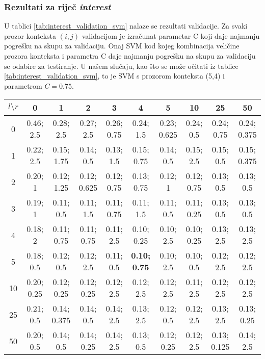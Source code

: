\documentclass[10pt, a4paper]{article}
\begin{document}
\subsubsection{Rezultati za riječ \emph{interest}}
U tablici \ref{tab:interest_validation_svm} nalaze se rezultati validacije.
Za svaki prozor konteksta $(i,j)$ validacijom je izračunat parametar C koji
daje najmanju pogrešku na skupu za validaciju. Onaj SVM kod kojeg kombinacija veličine prozora konteksta i parametra C daje najmanju pogrešku na skupu za validaciju se odabire za testiranje.
U našem slučaju, kao što se može očitati iz tablice \ref{tab:interest_validation_svm}, to je SVM s prozorom konteksta (5,4) i parametrom $C=0.75$.
\begin{table*}[!hbtp]
\caption{Pogreške i vrijednosti parametara C nakon provedene validacije SVM-a za riječ \emph{interest}}
\label{tab:interest_validation_svm}
\begin{center}
\begin{tabular}{|c|ccccccccc|}
\hline
$l \setminus r$ & 0 & 1 & 2 & 3 & 4 & 5 & 10 & 25 & 50 \\
\hline
0 & 0.46; 2.5 & 0.28; 2.5 & 0.27; 2.5 & 0.26; 0.75 & 0.24; 1.5 & 0.23; 0.625 & 0.24; 0.5 & 0.24; 0.75 & 0.24; 0.375 \\
1 & 0.22; 2.5 & 0.15; 1.75 & 0.14; 0.5 & 0.13; 1.5 & 0.15; 0.75 & 0.14; 0.5 & 0.15; 2.5 & 0.15; 0.5 & 0.15; 0.375 \\
2 & 0.20; 1 & 0.12; 1.25 & 0.12; 0.625 & 0.12; 0.75 & 0.13; 0.75 & 0.12; 1 & 0.12; 0.75 & 0.13; 0.5 & 0.13; 0.5 \\
3 & 0.19; 1 & 0.11; 0.5 & 0.11; 1.5 & 0.11; 0.75 & 0.11; 1.5 & 0.11; 0.5 & 0.11; 0.25 & 0.13; 0.5 & 0.13; 0.5 \\
4 & 0.18; 2 & 0.11; 0.75 & 0.11; 0.75 & 0.11; 2.5 & 0.10; 0.25 & 0.10; 2.5 & 0.10; 0.25 & 0.13; 2.5 & 0.13; 2.5 \\
5 & 0.18; 0.5 & 0.12; 0.5 & 0.12; 2.5 & 0.11; 0.5 & \textbf{0.10; 0.75} & 0.10; 2.5 & 0.10; 0.5 & 0.12; 2.5 & 0.12; 2.5 \\
10 & 0.20; 0.25 & 0.12; 0.25 & 0.12; 0.25 & 0.12; 2.5 & 0.12; 2.5 & 0.12; 2.5 & 0.11; 2.5 & 0.12; 2.5 & 0.12; 2.5 \\
25 & 0.21; 0.5 & 0.14; 0.375 & 0.14; 0.5 & 0.14; 2.5 & 0.13; 2.5 & 0.12; 0.5 & 0.12; 2.5 & 0.13; 2.5 & 0.13; 0.25 \\
50 & 0.20; 0.5 & 0.14; 0.5 & 0.14; 0.25 & 0.14; 2.5 & 0.13; 0.5 & 0.12; 0.25 & 0.12; 2.5 & 0.13; 0.125 & 0.14; 2.5 \\
\hline
\end{tabular}
\end{center}
\end{table*}
\end{document}
